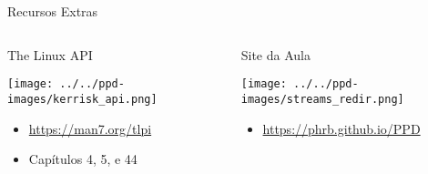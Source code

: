 \documentclass[10pt, compress, aspectratio=169, xcolor={table,usenames,dvipsnames}]{beamer}
\begin{document}
\begin{frame}[label={sec:org9aa1d9c}]{Recursos Extras}
\begin{columns}
\begin{column}{0.5\columnwidth}
\begin{block}{The Linux API}
\begin{center}
\texttt{[image: ../../ppd-images/kerrisk\_api.png]}
\end{center}

\begin{itemize}
\item \url{https://man7.org/tlpi}
\item Capítulos 4, 5, e 44
\end{itemize}
\end{block}
\end{column}

\begin{column}{0.5\columnwidth}
\begin{block}{Site da Aula}
\begin{center}
\texttt{[image: ../../ppd-images/streams\_redir.png]}
\end{center}

\begin{itemize}
\item \url{https://phrb.github.io/PPD}
\end{itemize}
\end{block}
\end{column}
\end{columns}
\end{frame}
\end{document}

